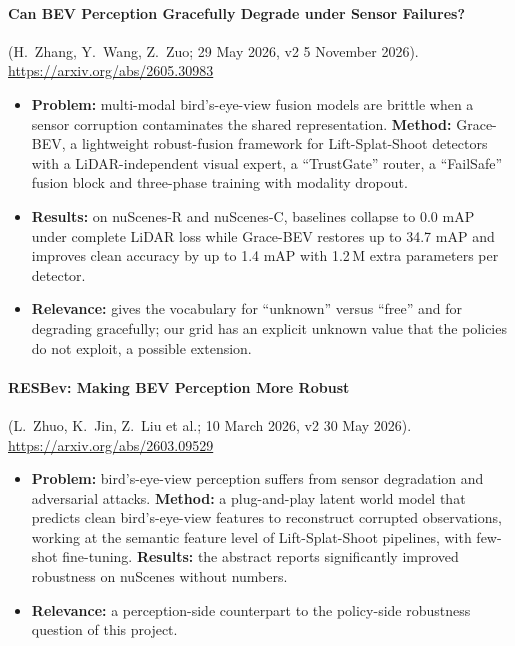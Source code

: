 \paragraph{Can BEV Perception Gracefully Degrade under Sensor Failures?} (H.~Zhang, Y.~Wang, Z.~Zuo; 29 May 2026, v2 5 November 2026). \url{https://arxiv.org/abs/2605.30983}
\begin{itemize}
\item \textbf{Problem:} multi-modal bird's-eye-view fusion models are brittle when a sensor corruption contaminates the shared representation. \textbf{Method:} Grace-BEV, a lightweight robust-fusion framework for Lift-Splat-Shoot detectors with a LiDAR-independent visual expert, a ``TrustGate'' router, a ``FailSafe'' fusion block and three-phase training with modality dropout.
\item \textbf{Results:} on nuScenes-R and nuScenes-C, baselines collapse to 0.0 mAP under complete LiDAR loss while Grace-BEV restores up to 34.7 mAP and improves clean accuracy by up to 1.4 mAP with 1.2\,M extra parameters per detector.
\item \textbf{Relevance:} gives the vocabulary for ``unknown'' versus ``free'' and for degrading gracefully; our grid has an explicit unknown value that the policies do not exploit, a possible extension.
\end{itemize}

\paragraph{RESBev: Making BEV Perception More Robust} (L.~Zhuo, K.~Jin, Z.~Liu et al.; 10 March 2026, v2 30 May 2026). \url{https://arxiv.org/abs/2603.09529}
\begin{itemize}
\item \textbf{Problem:} bird's-eye-view perception suffers from sensor degradation and adversarial attacks. \textbf{Method:} a plug-and-play latent world model that predicts clean bird's-eye-view features to reconstruct corrupted observations, working at the semantic feature level of Lift-Splat-Shoot pipelines, with few-shot fine-tuning. \textbf{Results:} the abstract reports significantly improved robustness on nuScenes without numbers.
\item \textbf{Relevance:} a perception-side counterpart to the policy-side robustness question of this project.
\end{itemize}

